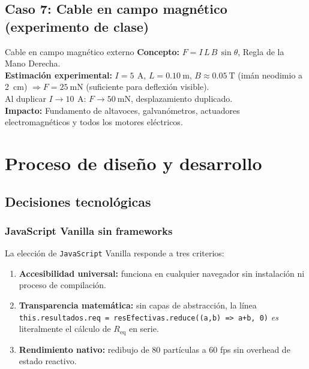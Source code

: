 \documentclass[12pt, a4paper]{article}
\newcommand{\A}{\,\si{\ampere}}
\newcommand{\Req}{R_{\mathrm{eq}}}
\newcommand{\js}{\texttt{JavaScript}}
\begin{document}
\subsection{Caso 7: Cable en campo magnético (experimento de clase)}

\begin{casodeuso}{Cable en campo magnético externo}
\textbf{Concepto:} $F = I\,L\,B\,\sin\theta$,\; Regla de la Mano Derecha.\\[4pt]
\textbf{Estimación experimental:}
$I = \SI{5}{\A}$,\; $L = \SI{0.10}{\metre}$,\; $B \approx \SI{0.05}{\tesla}$ (imán neodimio a \SI{2}{\centi\metre})
$\Rightarrow F = \SI{25}{\milli\newton}$ (suficiente para deflexión visible).\\[4pt]
Al duplicar $I \to \SI{10}{\A}$: $F \to \SI{50}{\milli\newton}$, desplazamiento duplicado.\\[4pt]
\textbf{Impacto:} Fundamento de altavoces, galvanómetros, actuadores
electromagnéticos y todos los motores eléctricos.
\end{casodeuso}

\section{Proceso de diseño y desarrollo}

\subsection{Decisiones tecnológicas}

\subsubsection{JavaScript Vanilla sin frameworks}

La elección de \js{} Vanilla responde a tres criterios:

\begin{enumerate}
  \item \textbf{Accesibilidad universal:} funciona en cualquier navegador
        sin instalación ni proceso de compilación.
  \item \textbf{Transparencia matemática:} sin capas de abstracción, la
        línea \texttt{this.resultados.req = resEfectivas.reduce((a,b) =>
        a+b, 0)} \emph{es} literalmente el cálculo de $\Req$ en serie.
  \item \textbf{Rendimiento nativo:} redibujo de 80 partículas a 60 fps
        sin overhead de estado reactivo.
\end{enumerate}
\end{document}
